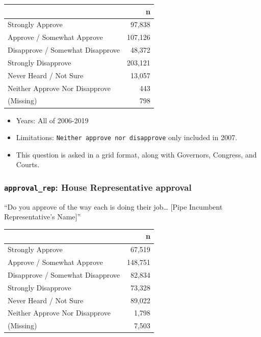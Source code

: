 \documentclass[10pt,article,oneside]{memoir}
\theoremstyle{definition}
\begin{document}
\begin{table}[H]
\centering
\begin{tabular}{lr}
\toprule
 & n\\
\midrule
Strongly Approve & 97,838\\
Approve / Somewhat Approve & 107,126\\
Disapprove / Somewhat Disapprove & 48,372\\
Strongly Disapprove & 203,121\\
Never Heard / Not Sure & 13,057\\
Neither Approve Nor Disapprove & 443\\
(Missing) & 798\\
\bottomrule
\end{tabular}
\end{table}

\begin{itemize}
\tightlist
\item
  Years: All of 2006-2019
\item
  Limitations: \texttt{Neither\ approve\ nor\ disapprove} only included
  in 2007.
\item
  This question is asked in a grid format, along with Governors,
  Congress, and Courts.
\end{itemize}

\hypertarget{approval_rep-house-representative-approval}{%
\subsubsection{\texorpdfstring{\texttt{approval\_rep}: House
Representative
approval}{approval\_rep: House Representative approval}}\label{approval_rep-house-representative-approval}}

``Do you approve of the way each is doing their job\ldots{} {[}Pipe
Incumbent Representative's Name{]}''

\begin{table}[H]
\centering
\begin{tabular}{lr}
\toprule
 & n\\
\midrule
Strongly Approve & 67,519\\
Approve / Somewhat Approve & 148,751\\
Disapprove / Somewhat Disapprove & 82,834\\
Strongly Disapprove & 73,328\\
Never Heard / Not Sure & 89,022\\
Neither Approve Nor Disapprove & 1,798\\
(Missing) & 7,503\\
\bottomrule
\end{tabular}
\end{table}
\end{document}
